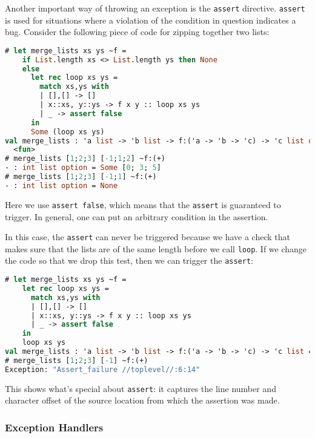 Another important way of throwing an exception is the
\passthrough{\lstinline!assert!} directive.
\passthrough{\lstinline!assert!} is used for situations where a
violation of the condition in question indicates a bug. Consider the
following piece of code for zipping together two
lists:

\begin{lstlisting}[language=Caml]
# let merge_lists xs ys ~f =
    if List.length xs <> List.length ys then None
    else
      let rec loop xs ys =
        match xs,ys with
        | [],[] -> []
        | x::xs, y::ys -> f x y :: loop xs ys
        | _ -> assert false
      in
      Some (loop xs ys)
val merge_lists : 'a list -> 'b list -> f:('a -> 'b -> 'c) -> 'c list option =
  <fun>
# merge_lists [1;2;3] [-1;1;2] ~f:(+)
- : int list option = Some [0; 3; 5]
# merge_lists [1;2;3] [-1;1] ~f:(+)
- : int list option = None
\end{lstlisting}

Here we use \passthrough{\lstinline!assert false!}, which means that the
\passthrough{\lstinline!assert!} is guaranteed to trigger. In general,
one can put an arbitrary condition in the assertion.

In this case, the \passthrough{\lstinline!assert!} can never be
triggered because we have a check that makes sure that the lists are of
the same length before we call \passthrough{\lstinline!loop!}. If we
change the code so that we drop this test, then we can trigger the
\passthrough{\lstinline!assert!}:

\begin{lstlisting}[language=Caml]
# let merge_lists xs ys ~f =
    let rec loop xs ys =
      match xs,ys with
      | [],[] -> []
      | x::xs, y::ys -> f x y :: loop xs ys
      | _ -> assert false
    in
    loop xs ys
val merge_lists : 'a list -> 'b list -> f:('a -> 'b -> 'c) -> 'c list = <fun>
# merge_lists [1;2;3] [-1] ~f:(+)
Exception: "Assert_failure //toplevel//:6:14"
\end{lstlisting}

This shows what's special about \passthrough{\lstinline!assert!}: it
captures the line number and character offset of the source location
from which the assertion was made.

\hypertarget{exception-handlers}{%
\subsubsection{Exception Handlers}\label{exception-handlers}}

